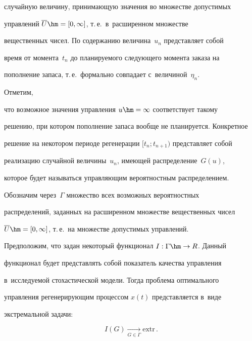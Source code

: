 случайную величину, принимающую значения во множестве допустимых 

управлений $\overline{U}\hm= [0,\infty]$, т.\,е.\ в~расширенном множестве 

вещественных чисел. По содержанию величина~$u_n$ представляет собой 

время от момента~$t_n$ до планируемого следующего момента заказа на 

пополнение запаса, т.\,е.\ формально совпадает с~величиной~$\eta_n$.

{



} 



Отметим, 

что возможное значения управления $u\hm=\infty$ соответствует такому 

решению, при котором пополнение запаса вообще не планируется. Конкретное 

решение на некотором периоде регенерации $[t_n;t_{n+1})$ представляет собой 

реализацию случайной величины~$u_n$, имеющей распределение~$G(u)$, 

которое будет называться управляющим вероятностным распределением.

  

  Обозначим через~$\Gamma$ множество всех возможных вероятностных 

распределений, заданных на расширенном множестве вещественных чисел 

$\overline{U}\hm=[0,\infty]$, т.\,е.\ на множестве допустимых управлений. 

Предположим, что задан некоторый функционал $I: \Gamma\hm\to R$. Данный 

функционал будет представлять собой показатель качества управления 

в~исследуемой стохастической модели. Тогда проблема оптимального 

управления регенерирующим процессом $x(t)$ представляется в~виде 

экстремальной задачи:

  \begin{equation}

  I(G)\underset{G\in\Gamma}{\to} \mathrm{extr}\,.

  \label{e1-sh}

  \end{equation}

  

